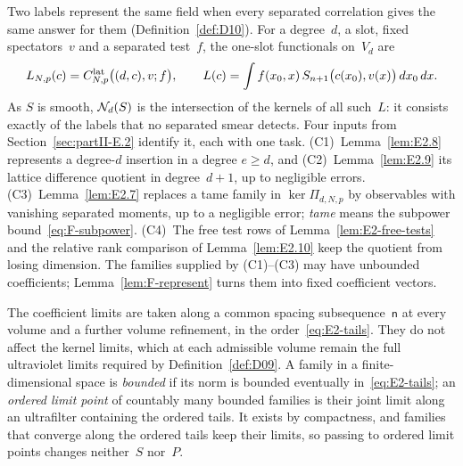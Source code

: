 Two labels represent the same field when every separated correlation gives the same answer for them (Definition~\ref{def:D10}). For a degree~$d$, a slot, fixed spectators~$v$ and a separated test~$f$, the one-slot functionals on~$V_d$ are
\begin{equation*}
L_{N,p}(c)=C^{\mathrm{lat}}_{N,p}\bigl((d,c),v;f\bigr),\qquad
L(c)=\int f(x_0,x)\,S_{n+1}\bigl(c(x_0),v(x)\bigr)\,dx_0\,dx.
\end{equation*}
As $S$ is smooth, $\mathcal{N}_{d}(S)$ is the intersection of the kernels of all such~$L$: it consists exactly of the labels that no separated smear detects. Four inputs from Section~\ref{sec:partII-E.2} identify it, each with one task. (C1)~Lemma~\ref{lem:E2.8} represents a degree-$d$ insertion in a degree $e\ge d$, and (C2)~Lemma~\ref{lem:E2.9} its lattice difference quotient in degree~$d+1$, up to negligible errors. (C3)~Lemma~\ref{lem:E2.7} replaces a tame family in $\ker\Pi_{d,N,p}$ by observables with vanishing separated moments, up to a negligible error; \emph{tame} means the subpower bound~\eqref{eq:F-subpower}. (C4)~The free test rows of Lemma~\ref{lem:E2-free-tests} and the relative rank comparison of Lemma~\ref{lem:E2.10} keep the quotient from losing dimension. The families supplied by (C1)--(C3) may have unbounded coefficients; Lemma~\ref{lem:F-represent} turns them into fixed coefficient vectors.

The coefficient limits are taken along a common spacing subsequence~$\mathsf n$ at every volume and a further volume refinement, in the order~\eqref{eq:E2-tails}. They do not affect the kernel limits, which at each admissible volume remain the full ultraviolet limits required by Definition~\ref{def:D09}. A family in a finite-dimensional space is \emph{bounded} if its norm is bounded eventually in~\eqref{eq:E2-tails}; an \emph{ordered limit point} of countably many bounded families is their joint limit along an ultrafilter containing the ordered tails. It exists by compactness, and families that converge along the ordered tails keep their limits, so passing to ordered limit points changes neither~$S$ nor~$P$.

